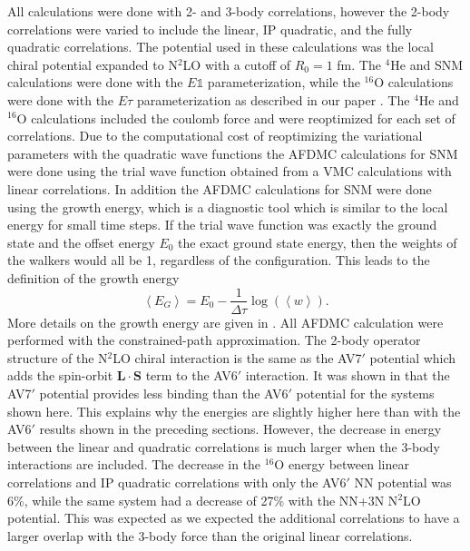 All calculations were done with 2- and 3-body correlations, however the 2-body correlations were varied to include the linear, IP quadratic, and the fully quadratic correlations. The potential used in these calculations was the local chiral potential expanded to N$^2$LO with a cutoff of $R_0=1$ fm. The $^4$He and SNM calculations were done with the $E\mathbb{1}$ parameterization, while the $^{16}$O calculations were done with the $E\tau$ parameterization as described in our paper \cite{lonardoni2018}. The $^4$He and $^{16}$O calculations included the coulomb force and were reoptimized for each set of correlations. Due to the computational cost of reoptimizing the variational parameters with the quadratic wave functions the AFDMC calculations for SNM were done using the trial wave function obtained from a VMC calculations with linear correlations. In addition the AFDMC calculations for SNM were done using the growth energy, which is a diagnostic tool which is similar to the local energy for small time steps. If the trial wave function was exactly the ground state and the offset energy $E_0$ the exact ground state energy, then the weights of the walkers would all be 1, regardless of the configuration. This leads to the definition of the growth energy
\begin{equation}
\left<E_G\right> = E_0-\frac{1}{\Delta\tau}\log{(\left<w\right>)}.
\end{equation}
More details on the growth energy are given in \cite{lynn2013}. All AFDMC calculation were performed with the constrained-path approximation. The 2-body operator structure of the N$^2$LO chiral interaction is the same as the AV7$'$ potential which adds the spin-orbit $\mathbf{L}\cdot\mathbf{S}$ term to the AV6$'$ interaction. It was shown in \cite{gandolfi2014} that the AV7$'$ potential provides less binding than the AV6$'$ potential for the systems shown here. This explains why the energies are slightly higher here than with the AV6$'$ results shown in the preceding sections. However, the decrease in energy between the linear and quadratic correlations is much larger when the 3-body interactions are included. The decrease in the $^{16}$O energy between linear correlations and IP quadratic correlations with only the AV6$'$ NN potential was 6\%, while the same system had a decrease of 27\% with the NN+3N N$^2$LO potential. This was expected as we expected the additional correlations to have a larger overlap with the 3-body force than the original linear correlations.

